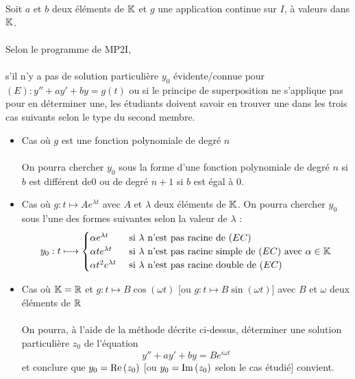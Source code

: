 \begin{defprop}
    Soit \(a\) et \(b\) deux éléments de \(\mathbb{K}\) et \(g\) une application continue sur \(I\), à valeurs dans \(\mathbb{K}\).\\~\\
    Selon le programme de MP2I,\\~\\
    s’il n’y a pas de solution particulière \(y_0\) évidente/connue pour \((E) : y'' + ay' + by = g(t)\) ou si le principe de superposition ne s’applique pas pour en déterminer une, les étudiants doivent savoir en trouver une dans les trois cas suivants selon le type du second membre.
    \begin{itemize}
        \item Cas où \(g\) est une fonction polynomiale de degré \(n\)\\~\\
        On pourra chercher \(y_0\) sous la forme d’une fonction polynomiale de degré \(n\) si \(b\) est différent de\( 0\) ou de degré \(n + 1\) si \(b\) est égal à \(0\).
        \item Cas où \(g : t \mapsto A e^{\lambda t}\) avec \(A\) et \(\lambda\) deux éléments de \(\mathbb{K}\).
        On pourra chercher \(y_0\) sous l’une des formes suivantes selon la valeur de \(\lambda\) :
        \[y_0 : t \longmapsto \begin{cases}
            \alpha e^{\lambda t} &\text{ si } \lambda \text{ n'est pas racine de } (EC)\\
            \alpha t e^{\lambda t} &\text{ si } \lambda \text{ n'est pas racine simple de } (EC) \text{ avec } \alpha \in \mathbb{K}\\
            \alpha t^2 e^{\lambda t} &\text{ si } \lambda \text{ n'est pas racine double de } (EC)\\
        \end{cases}\]
        \item  Cas où \(\mathbb{K} = \mathbb{R}\) et \(g : t \mapsto B \cos (\omega t)\) [ou \(g : t \mapsto B \sin (\omega t)\)] avec \(B\) et \(\omega\) deux éléments de \(\mathbb{R}\)\\~\\
            On pourra, à l’aide de la méthode décrite ci-dessus, déterminer une solution particulière \(z_0\) de l’équation
           \[ y'' + ay' + by = B e^{i\omega t}\]
            et conclure que \(y_0 = \operatorname{Re}\left(z_0\right)\) [ou \(y_0 = \operatorname{Im}\left(z_0\right)\) selon le cas étudié] convient.
    \end{itemize}
\end{defprop}

